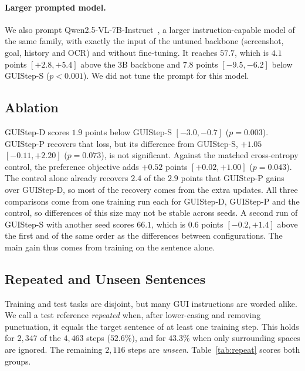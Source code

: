 \documentclass[runningheads,a4paper]{llncs}
\begin{document}
\paragraph{Larger prompted model.}
We also prompt Qwen2.5-VL-7B-Instruct~\cite{qwen25vl}, a larger instruction-capable model of the same family, with exactly the input of the untuned backbone (screenshot, goal, history and OCR) and without fine-tuning. It reaches $57.7$, which is $4.1$ points $[+2.8,+5.4]$ above the 3B backbone and $7.8$ points $[-9.5,-6.2]$ below \mbox{GUIStep-S} ($p<0.001$). We did not tune the prompt for this model.

\subsection{Ablation}

\mbox{GUIStep-D} scores $1.9$ points below \mbox{GUIStep-S} $[-3.0,-0.7]$ ($p=0.003$). \mbox{GUIStep-P} recovers that loss, but its difference from \mbox{GUIStep-S}, $+1.05$ $[-0.11,+2.20]$ ($p=0.073$), is not significant. Against the matched cross-entropy control, the preference objective adds $+0.52$ points $[+0.02,+1.00]$ ($p=0.043$). The control alone already recovers $2.4$ of the $2.9$ points that \mbox{GUIStep-P} gains over \mbox{GUIStep-D}, so most of the recovery comes from the extra updates. All three comparisons come
from one training run each for \mbox{GUIStep-D}, \mbox{GUIStep-P} and the control, so differences of this size
may not be stable across seeds. A second run of \mbox{GUIStep-S} with another seed scores $66.1$, which is $0.6$ points $[-0.2,+1.4]$ above the first and of the same order as the differences between configurations. The main gain thus comes from training on the sentence alone.

\subsection{Repeated and Unseen Sentences}
\label{sec:repeat}

Training and test tasks are disjoint, but many GUI instructions are worded alike. We call a test
reference \emph{repeated} when, after lower-casing and removing punctuation, it equals the target
sentence of at least one training step. This holds for $2{,}347$ of the $4{,}463$ steps
($52.6\%$), and for $43.3\%$ when only surrounding spaces are ignored. The remaining
$2{,}116$ steps are \emph{unseen}. Table~\ref{tab:repeat} scores both groups.
\end{document}
